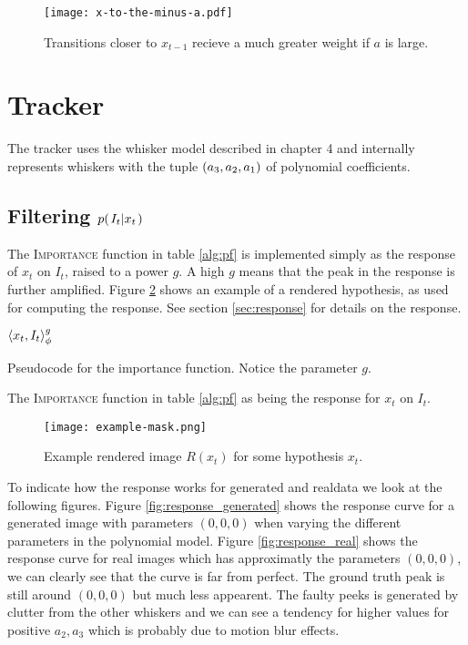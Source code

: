 \begin{figure}[ht]
  \centering
  \texttt{[image: x-to-the-minus-a.pdf]}
  \caption{Transitions closer to $x_{t-1}$ recieve a much greater
    weight if $a$ is large.}
  \label{fig:x-to-the-minus-a}
\end{figure}

\section{Tracker}

The tracker uses the whisker model described in chapter 4 and
internally represents whiskers with the tuple $\left( a_3, a_2, a_1 \right)$ of polynomial
coefficients.

\subsection{Filtering $p{(\left. I_t \middle\vert x_t \right.)}$}
\label{sec:filtering}
The \textsc{Importance} function in table \ref{alg:pf} is implemented
simply as the response of $x_t$ on $I_t$, raised to a power $g$. A
high $g$ means that the peak in the response is further
amplified. Figure \ref{fig:example-mask} shows an example of a
rendered hypothesis, as used for computing the response. See section
\ref{sec:response} for details on the response.

\begin{table}[hb]
  \begin{codebox}
    \li \Return $\langle x_t, I_t\rangle_{\phi}^g$
  \end{codebox}
  \caption{Pseudocode for the importance function. Notice the parameter $g$.}
  \label{alg:importance}
\end{table}

The \textsc{Importance} function in table \ref{alg:pf} as being the response for $x_t$ on $I_t$.
\begin{figure}[hb]
  \centering
  \texttt{[image: example-mask.png]}
  \caption{Example rendered image $R(x_t)$ for some hypothesis $x_t$.}
  \label{fig:example-mask}
\end{figure}

To indicate how the response works for generated and realdata we look at the following figures.
Figure \ref{fig:response_generated} shows the response curve for a generated image with parameters $(0,0,0)$ when varying the different parameters in the polynomial model.
Figure \ref{fig:response_real} shows the response curve for real images which has approximatly the parameters $(0,0,0)$, we can clearly see that the curve is far from perfect. 
The ground truth peak is still around $(0,0,0)$ but much less appearent.
The faulty peeks is generated by clutter from the other whiskers and we can see a tendency for higher values for positive $a_2,a_3$ which is probably due to motion blur effects.

